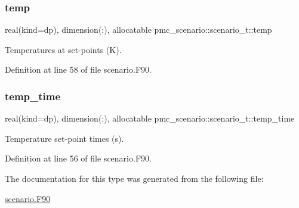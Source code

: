 \mbox{\label{structpmc__scenario_1_1scenario__t_a24e15d681947f9d0096293df5e67bbb8}} 
\subsubsection{\texorpdfstring{temp}{temp}}
{\footnotesize\ttfamily real(kind=dp), dimension(\+:), allocatable pmc\+\_\+scenario\+::scenario\+\_\+t\+::temp}



Temperatures at set-\/points (K). 



Definition at line 58 of file scenario.\+F90.

\mbox{\label{structpmc__scenario_1_1scenario__t_aa25d76136ee1927867d84a22dfd0ae80}} 
\subsubsection{\texorpdfstring{temp\+\_\+time}{temp\_time}}
{\footnotesize\ttfamily real(kind=dp), dimension(\+:), allocatable pmc\+\_\+scenario\+::scenario\+\_\+t\+::temp\+\_\+time}



Temperature set-\/point times (s). 



Definition at line 56 of file scenario.\+F90.



The documentation for this type was generated from the following file\+:\begin{DoxyCompactItemize}
\item 
\mbox{\hyperlink{scenario_8_f90}{scenario.\+F90}}\end{DoxyCompactItemize}

